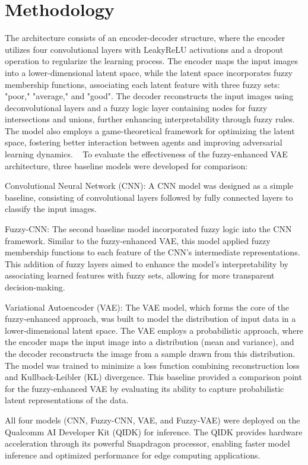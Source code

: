 \documentclass[9pt,a4paper,twoside]{rho-class/rho}
\begin{document}
    
\section{Methodology}
    The architecture consists of an encoder-decoder structure, where the encoder utilizes four convolutional layers with LeakyReLU activations and a dropout operation to regularize the learning process. The encoder maps the input images into a lower-dimensional latent space, while the latent space incorporates fuzzy membership functions, associating each latent feature with three fuzzy sets: "poor," "average," and "good". The decoder reconstructs the input images using deconvolutional layers and a fuzzy logic layer containing nodes for fuzzy intersections and unions, further enhancing interpretability through fuzzy rules. The model also employs a game-theoretical framework for optimizing the latent space, fostering better interaction between agents and improving adversarial learning dynamics. ~\cite{zhang}
    To evaluate the effectiveness of the fuzzy-enhanced VAE architecture, three baseline models were developed for comparison:
    
    Convolutional Neural Network (CNN): A CNN model was designed as a simple baseline, consisting of convolutional layers followed by fully connected layers to classify the input images. 
    
    Fuzzy-CNN: The second baseline model incorporated fuzzy logic into the CNN framework. Similar to the fuzzy-enhanced VAE, this model applied fuzzy membership functions to each feature of the CNN's intermediate representations. This addition of fuzzy layers aimed to enhance the model's interpretability by associating learned features with fuzzy sets, allowing for more transparent decision-making.
    
    Variational Autoencoder (VAE): The VAE model, which forms the core of the fuzzy-enhanced approach, was built to model the distribution of input data in a lower-dimensional latent space. The VAE employs a probabilistic approach, where the encoder maps the input image into a distribution (mean and variance), and the decoder reconstructs the image from a sample drawn from this distribution. The model was trained to minimize a loss function combining reconstruction loss and Kullback-Leibler (KL) divergence. This baseline provided a comparison point for the fuzzy-enhanced VAE by evaluating its ability to capture probabilistic latent representations of the data.

    All four models (CNN, Fuzzy-CNN, VAE, and Fuzzy-VAE) were deployed on the Qualcomm AI Developer Kit (QIDK) for inference. The QIDK provides hardware acceleration through its powerful Snapdragon processor, enabling faster model inference and optimized performance for edge computing applications. 
\end{document}
